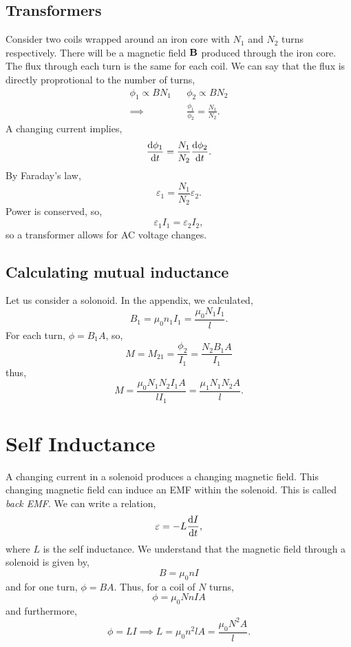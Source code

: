 \documentclass{book}
\begin{document}
\subsection{Transformers}
Consider two coils wrapped around an iron core with $N_1$ and $N_2$ turns respectively. There will be a magnetic field $\vb{B}$ produced through the iron core. The flux through each turn is the same for each coil. We can say that the flux is directly proprotional to the number of turns,
\begin{align}
	\phi_1 \propto BN_1 && \phi_2 \propto BN_2 \\
	\implies && \frac{\phi_1}{\phi_2} = \frac{N_1}{N_2}.
\end{align}
A changing current implies,
\begin{equation}
	\dv{\phi_1}{t} = \frac{N_1}{N_2}\dv{\phi_2}{t}.
\end{equation}
By Faraday's law,
\begin{equation}
	\varepsilon_1 = \frac{N_1}{N_2}\varepsilon_2.
\end{equation}
Power is conserved, so,
\begin{equation}
	\varepsilon_1 I_1 = \varepsilon_2 I_2,
\end{equation}
so a transformer allows for AC voltage changes.
\subsection{Calculating mutual inductance}
Let us consider a solonoid. In the appendix, we calculated,
\begin{equation}
	B_1 = \mu_0 n_1 I_1 = \frac{\mu_0 N_1 I_1}{l}.
\end{equation}
For each turn, $\phi = B_1 A$, so,
\begin{equation}
	M = M_21 = \frac{\phi_2}{I_1} = \frac{N_2B_1A}{I_1}
\end{equation}
thus,
\begin{equation}
	M = \frac{\mu_0N_1N_2I_1A}{lI_1} = \frac{\mu_1N_1N_2A}{l}.
\end{equation}
\section{Self Inductance}
A changing current in a solenoid produces a changing magnetic field. This changing magnetic field can induce an EMF within the solenoid. This is called \textit{back EMF}. We can write a relation,
\begin{equation}
	\varepsilon = -L \dv{I}{t},
\end{equation}
where $L$ is the self inductance. We understand that the magnetic field through a solenoid is given by,
\begin{equation}
	B = \mu_0nI \label{eq:solenoid}
\end{equation}
and for one turn, $\phi = BA$. Thus, for a coil of $N$ turns,
\begin{equation}
	\phi = \mu_0NnIA
\end{equation}
and furthermore,
\begin{equation}
	\phi = LI \implies L = \mu_0n^2lA = \frac{\mu_0N^2A}{l}. \label{eq:inductance}
\end{equation}
\end{document}
